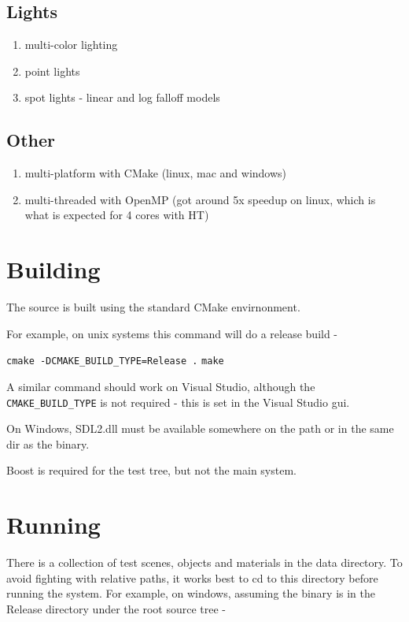 \subsection{Lights}
    \begin{enumerate}
    \item multi-color lighting
    \item point lights
    \item spot lights - linear and log falloff models
    \end{enumerate}

\subsection{Other}
    \begin{enumerate}
    \item multi-platform with CMake (linux, mac and windows)
    \item multi-threaded with OpenMP (got around 5x speedup on linux, which is what is expected for 4 cores with HT)
    \end{enumerate}

\section{Building}

The source is built using the standard CMake envirnonment.

For example, on unix systems this command will do a release build -

\verb|cmake -DCMAKE_BUILD_TYPE=Release .|
\verb|make|

A similar command should work on Visual Studio, although the \verb|CMAKE_BUILD_TYPE| is not required - this is set in the Visual Studio gui.

On Windows, SDL2.dll must be available somewhere on the path or in the same dir as the binary. 

Boost is required for the test tree, but not the main system.

\section{Running}

There is a collection of test scenes, objects and materials in the data directory. To avoid fighting with relative paths, it works best to cd to this directory before running the system. For example, on windows, assuming the binary is in the Release directory under the root source tree - 

